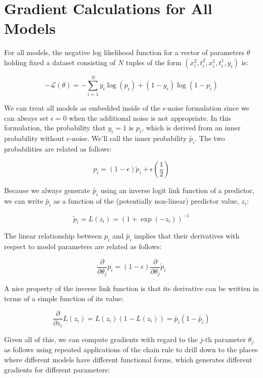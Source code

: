 \documentclass[12pt]{article}
\begin{document}
\section{Gradient Calculations for All Models}

For all models, the negative log likelihood function for a vector of parameters
$\theta$ holding fixed a dataset consisting of $N$ tuples of the form
$(x^2_i, t^2_i, x^1_i, t^1_i, y_i)$ is:

\[
-\mathcal{L}(\theta) = -\sum_{i = 1}^{N} y_i \log(p_i) + (1 - y_i) \log(1 - p_i)
\]

We can treat all models as embedded inside of the $\epsilon$-noise formulation
since we can always set $\epsilon = 0$ when the additional noise is not
appropriate. In this formulation, the probability that $y_i = 1$ is $p_i$,
which is derived from an inner probability without $\epsilon$-noise. We'll call
the inner probability $\tilde{p_i}$. The two probabilities are related as
follows:

\[
p_i = (1 - \epsilon) \tilde{p}_i + \epsilon (\frac{1}{2})
\]

Because we always generate $\tilde{p_i}$ using an inverse logit link function
of a predictor, we can write $\tilde{p_i}$ as a function of the (potentially
non-linear) predictor value, $z_i$:

\[
\tilde{p}_i = L(z_i) = (1 + \exp(-z_i))^{-1}
\]

The linear relationship between $p_i$ and $\tilde{p_i}$ implies that their
derivatives with respect to model parameters are related as follows:

\[
\frac{\partial}{\partial \theta_j} p_i
  = (1 - \epsilon) \frac{\partial}{\partial \theta_j} \tilde{p}_i
\]

A nice property of the inverse link function is that its derivative can be
written in terms of a simple function of its value:

\[
\frac{\partial}{\partial z_i} L(z_i)
  = L(z_i) (1 - L(z_i)) = \tilde{p_i} (1 - \tilde{p_i})
\]

Given all of this, we can compute gradients with regard to the $j$-th parameter
$\theta_j$ as follows using repeated applications of the chain rule to drill
down to the places where different models have different functional forms,
which generates different gradients for different parameters:
\end{document}
